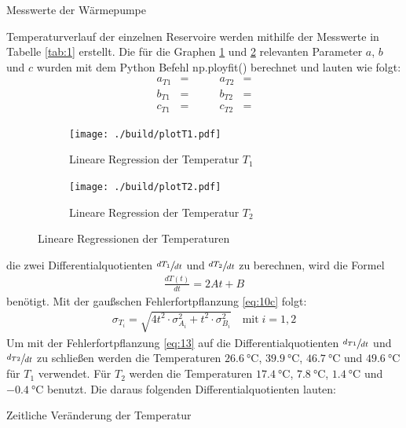 \begin{table}[H]
    \centering
    
    \caption{Messwerte der Wärmepumpe}
    \label{tab:1}
\end{table}
\newpage

\justifying Temperaturverlauf der einzelnen Reservoire werden mithilfe der Messwerte in Tabelle \ref{tab:1} erstellt. Die für
die Graphen \ref{fig:3a} und \ref{fig:3b} relevanten Parameter $a$, $b$ und $c$ wurden mit dem Python Befehl np.ployfit() \cite{numpy}
berechnet und lauten wie folgt:
\begin{subequations}
\begin{align}
    a_{T1} &= \text{} \qquad &a_{T2} &= \text{} \label{eq:11a}\\
    b_{T1} &= \text{} \qquad &b_{T2} &= \text{} \label{eq:11b}\\
    c_{T1} &= \text{} \qquad &c_{T2} &= \text{} \label{eq:11c}
\end{align}
\end{subequations}

\begin{figure}[H]
    \begin{subfigure}{0.495\linewidth}
        \centering
        \texttt{[image: ./build/plotT1.pdf]}
        \caption{Lineare Regression der Temperatur $T_1$}
        \label{fig:3a}
    \end{subfigure}
    \begin{subfigure}{0.495\linewidth}
        \centering
        \texttt{[image: ./build/plotT2.pdf]}
        \caption{Lineare Regression der Temperatur $T_2$}
        \label{fig:3b}
    \end{subfigure}
    \caption{Lineare Regressionen der Temperaturen}
    \label{fig:3}
\end{figure}

\justifying die zwei Differentialquotienten $\sfrac{dT_{1}}{dt}$ und $\sfrac{dT_{2}}{dt}$ zu berechnen, wird die Formel
\begin{align}
    \frac{dT(t)}{dt} = 2At + B \label{eq:12}
\end{align}
benötigt. Mit der gaußschen Fehlerfortpflanzung \eqref{eq:10c} folgt:
\begin{align}
    \sigma_{T_i} = \sqrt{4t^2 \cdot \sigma _{A_i}^2 + t^2 \cdot \sigma _{B_i}^2} \label{eq:13}\quad \text{mit}\; i = 1,2
\end{align}
Um mit der Fehlerfortpflanzung \eqref{eq:13} auf die Differentialquotienten $\sfrac{d_{T1}}{dt}$ und $\sfrac{d_{T2}}{dt}$ zu schließen werden die 
Temperaturen $\SI{26.6}{\celsius}$, $\SI{39.9}{\celsius}$, $\SI{46.7}{\celsius}$ und $\SI{49.6}{\celsius}$ für $T_1$ verwendet. Für $T_2$ 
werden die Temperaturen $\SI{17.4}{\celsius}$, $\SI{7.8}{\celsius}$, $\SI{1.4}{\celsius}$ und $\SI{-0.4}{\celsius}$ benutzt.
Die daraus folgenden Differentialquotienten lauten:
\begin{table}[H]
    \centering
    
    \caption{Zeitliche Veränderung der Temperatur} \label{tab:2}
\end{table}


